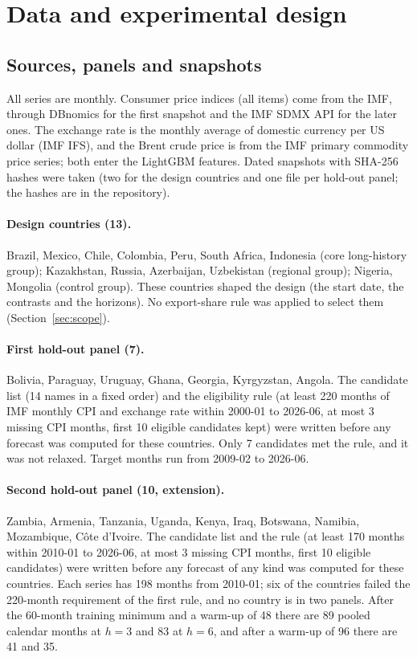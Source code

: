 \section{Data and experimental design}\label{sec:data}

\subsection{Sources, panels and snapshots}\label{sec:panels}

All series are monthly. Consumer price indices (all items) come from the IMF, through DBnomics for the first snapshot and the IMF SDMX API for the later ones. The exchange rate is the monthly average of domestic currency per US dollar (IMF IFS), and the Brent crude price is from the IMF primary commodity price series; both enter the LightGBM features. Dated snapshots with SHA-256 hashes were taken (two for the design countries and one file per hold-out panel; the hashes are in the repository).

\paragraph{Design countries (13).} Brazil, Mexico, Chile, Colombia, Peru, South Africa, Indonesia (core long-history group); Kazakhstan, Russia, Azerbaijan, Uzbekistan (regional group); Nigeria, Mongolia (control group). These countries shaped the design (the start date, the contrasts and the horizons). No export-share rule was applied to select them (Section~\ref{sec:scope}).

\paragraph{First hold-out panel (7).} Bolivia, Paraguay, Uruguay, Ghana, Georgia, Kyrgyzstan, Angola. The candidate list (14 names in a fixed order) and the eligibility rule (at least 220 months of IMF monthly CPI and exchange rate within 2000-01 to 2026-06, at most 3 missing CPI months, first 10 eligible candidates kept) were written before any forecast was computed for these countries. Only 7 candidates met the rule, and it was not relaxed. Target months run from 2009-02 to 2026-06.

\paragraph{Second hold-out panel (10, extension).} Zambia, Armenia, Tanzania, Uganda, Kenya, Iraq, Botswana, Namibia, Mozambique, C\^ote d'Ivoire. The candidate list and the rule (at least 170 months within 2010-01 to 2026-06, at most 3 missing CPI months, first 10 eligible candidates) were written before any forecast of any kind was computed for these countries. Each series has 198 months from 2010-01; six of the countries failed the 220-month requirement of the first rule, and no country is in two panels. After the 60-month training minimum and a warm-up of 48 there are 89 pooled calendar months at $h=3$ and 83 at $h=6$, and after a warm-up of 96 there are 41 and 35.

